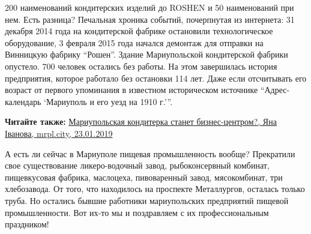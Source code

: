 200 наименований кондитерских изделий до ROSHEN и 50 наименований при нем. Есть
разница? Печальная хроника событий, почерпнутая из интернета: 31 декабря 2014
года на кондитерской фабрике остановили технологическое оборудование, 3 февраля
2015 года начался демонтаж для отправки на Винницкую фабрику \enquote{Рошен}. Здание
Мариупольской кондитерской фабрики опустело. 700 человек остались без работы.
На этом завершилась история предприятия, которое работало без остановки 114
лет. Даже если отсчитывать его возраст от первого упоминания в известном
историческом источнике \enquote{Адрес-календарь \enquote{Мариуполь и его уезд на 1910 г.}}.

\textbf{Читайте также:} \href{https://mrpl.city/news/view/mariupolskaya-konditerka-stanet-biznes-tsentrom-foto-plusvideo}{%
Мариупольская кондитерка станет бизнес-центром?, Яна Іванова, mrpl.city, 23.01.2019}

А есть ли сейчас в Мариуполе пищевая промышленность вообще? Прекратили свое
существование ликеро-водочный завод, рыбоконсервный комбинат, пищевкусовая
фабрика, маслоцеха, пивоваренный завод, мясокомбинат, три хлебозавода. От того,
что находилось на проспекте Металлургов, осталась только труба. Но остались
бывшие работники мариупольских предприятий пищевой промышленности. Вот их-то мы
и поздравляем с их профессиональным праздником!
